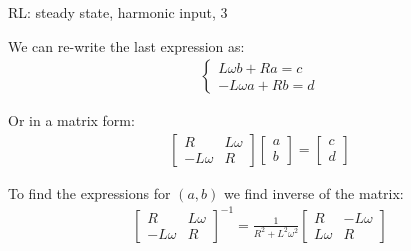 \documentclass{beamer}
\begin{document}
\begin{frame}{RL: steady state, harmonic input, 3}
	\begin{flushleft}
		
		We can re-write the last expression as:
		\begin{align}
			\begin{cases}
				L\omega b + Ra = c  \\
				-L\omega a + Rb = d
			\end{cases}
		\end{align}
	
		Or in a matrix form:
		\begin{align}
			\begin{bmatrix}
				R & L\omega \\
				-L\omega & R
			\end{bmatrix}
			\begin{bmatrix}
				a \\ b
			\end{bmatrix}
			=
			\begin{bmatrix}
				c \\ d
			\end{bmatrix}
		\end{align}
		
		To find the expressions for $(a, b)$ we find inverse of the matrix:
		\begin{align}
			\begin{bmatrix}
				R & L\omega \\
				-L\omega & R
			\end{bmatrix}^{-1}
		=
		\frac{1}{R^2 + L^2 \omega^2}
			\begin{bmatrix}
				R & -L\omega \\
				L\omega & R
			\end{bmatrix}		
		\end{align}
		
		
	\end{flushleft}
\end{frame}
\end{document}
